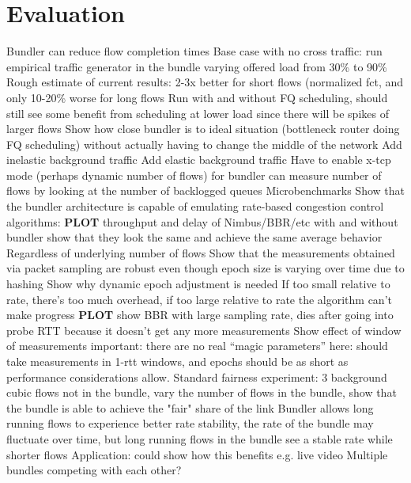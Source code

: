 \section{Evaluation}\label{s:eval}



\begin{outline}[enumerate]
    \1 Bundler can reduce flow completion times
        \2 Base case with no cross traffic: run empirical traffic generator in the bundle varying offered load from 30\% to 90\%
            \3 Rough estimate of current results: 2-3x better for short flows (normalized fct, and only 10-20\% worse for long flows
            \3 Run with and without FQ scheduling, should still see some benefit from scheduling at lower load since there will be spikes of larger flows
            \3 Show how close bundler is to ideal situation (bottleneck router doing FQ scheduling) without actually having to change the middle of the network
        \2 Add inelastic background traffic
        \2 Add elastic background traffic
            \3 Have to enable x-tcp mode (perhaps dynamic number of flows) for bundler
            \3 can measure number of flows by looking at the number of backlogged queues
    \1 Microbenchmarks
        \2 Show that the bundler architecture is capable of emulating rate-based congestion control algorithms: \textbf{PLOT} throughput and delay of Nimbus/BBR/etc with and without bundler show that they look the same and achieve the same average behavior 
            \3 Regardless of underlying number of flows
        \2 Show that the measurements obtained via packet sampling are robust even though epoch size is varying over time due to hashing
        \2 Show why dynamic epoch adjustment is needed 
            \3 If too small relative to rate, there's too much overhead, if too large relative to rate the algorithm can't make progress
            \3 \textbf{PLOT} show BBR with large sampling rate, dies after going into probe RTT because it doesn't get any more measurements 
            \3 Show effect of window of measurements
                \4 important: there are no real ``magic parameters'' here: \name should take measurements in 1-rtt windows, and epochs should be as short as performance considerations allow.
        \2 Standard fairness experiment: 3 background cubic flows not in the bundle, vary the number of flows in the bundle, show that the bundle is able to achieve the "fair" share of the link 
    \1 Bundler allows long running flows to experience better rate stability, the rate of the bundle may fluctuate over time, but long running flows in the bundle see a stable rate while shorter flows 
        \2 Application: could show how this benefits e.g. live video 
    \1 Multiple bundles competing with each other?
    

\end{outline}
